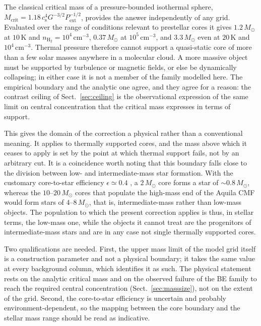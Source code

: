 \documentclass[11pt,a4paper]{article}
\newcommand{\msun}{M_{\odot}}
\newcommand{\cs}{c_{\mathrm{s}}}
\begin{document}
The classical critical mass of a pressure-bounded isothermal sphere,
$M_{\mathrm{crit}}=1.18\,\cs^{4}G^{-3/2}P_{\mathrm{ext}}^{-1/2}$, provides the
answer independently of any grid. Evaluated over the range of conditions
relevant to prestellar cores it gives $1.2\,\msun$ at $10$\,K and
$n_{\mathrm{H_2}}=10^{4}\,\mathrm{cm^{-3}}$, $0.37\,\msun$ at
$10^{5}\,\mathrm{cm^{-3}}$, and $3.3\,\msun$ even at $20$\,K and
$10^{4}\,\mathrm{cm^{-3}}$. Thermal pressure therefore cannot support a
quasi-static core of more than a few solar masses anywhere in a molecular
cloud. A more massive object must be supported by turbulence or magnetic
fields, or else be dynamically collapsing; in either case it is not a member
of the family modelled here. The empirical boundary and the analytic one
agree, and they agree for a reason: the contrast ceiling of
Sect.~\ref{sec:ceiling} is the observational expression of the same limit on
central concentration that the critical mass expresses in terms of support.

This gives the domain of the correction a physical rather than a conventional
meaning. It applies to thermally supported cores, and the mass above which it
ceases to apply is set by the point at which thermal support fails, not by an
arbitrary cut. It is a coincidence worth noting that this boundary falls close
to the division between low- and intermediate-mass star formation. With the
customary core-to-star efficiency $\epsilon\simeq0.4$
\citep{Andre+2010,Konyves+2015}, a $2\,\msun$ core forms a star of
$\sim$$0.8\,\msun$, whereas the $10$--$20\,\msun$ cores that populate the
high-mass end of the Aquila CMF would form stars of $4$--$8\,\msun$, that is,
intermediate-mass rather than low-mass objects. The population to which the
present correction applies is thus, in stellar terms, the low-mass one, while
the objects it cannot treat are the progenitors of intermediate-mass stars
and are in any case not single thermally supported cores.

Two qualifications are needed. First, the upper mass limit of the model grid
itself is a construction parameter and not a physical boundary; it takes the
same value at every background column, which identifies it as such. The
physical statement rests on the analytic critical mass and on the observed
failure of the BE family to reach the required central concentration
(Sect.~\ref{sec:masssize}), not on the extent of the grid. Second, the
core-to-star efficiency is uncertain and probably environment-dependent, so
the mapping between the core boundary and the stellar mass range should be
read as indicative.
\end{document}
